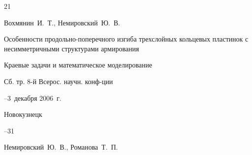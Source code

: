 \begin{thebibliography}{21}





\by Вохмянин~И.~Т., Немировский~Ю.~В.

\paper Особенности продольно-поперечного изгиба трехслойных кольцевых пластинок с несимметричными структурами армирования

\inbook Краевые задачи и математическое моделирование

\bookinfo Сб. тр. 8-й Всерос. научн. конф-ции

--3~декабря 2006~г.

\publaddr Новокузнецк



--31





















\by Немировский~Ю.~В., Романова~Т.~П.


\end{thebibliography}

